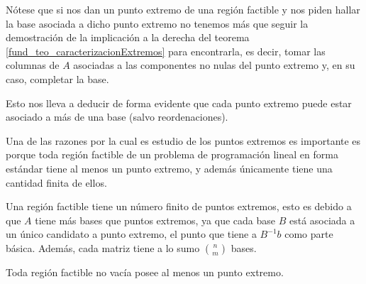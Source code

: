\begin{obs}
	Nótese que si nos dan un punto extremo de una región factible y nos piden hallar la base asociada a dicho punto extremo no tenemos más que seguir la demostración de la implicación a la derecha del teorema \ref{fund_teo_caracterizacionExtremos} para encontrarla, es decir, tomar las columnas de $A$ asociadas a las componentes no nulas del punto extremo y, en su caso, completar la base.
	
	Esto nos lleva a deducir de forma evidente que cada punto extremo puede estar asociado a más de una base (salvo reordenaciones).
\end{obs}
Una de las razones por la cual es estudio de los puntos extremos es importante es porque toda región factible de un problema de programación lineal en forma estándar tiene al menos un punto extremo, y además únicamente tiene una cantidad finita de ellos.
\begin{obs}[Finitud]
	\label{fund_obs_finitudExtremos}
	Una región factible tiene un número finito de puntos extremos, esto es debido a que $A$ tiene más bases que puntos extremos, ya que cada base $B$ está asociada a un único candidato a punto extremo, el punto que tiene a $B^{-1}b$ como parte básica. Además, cada matriz tiene a lo sumo $\binom{n}{m}$ bases.
\end{obs}
\begin{theo}[Existencia]
	\label{fund_teo_existenciaExtremos}
	Toda región factible no vacía posee al menos un punto extremo.
\end{theo}
